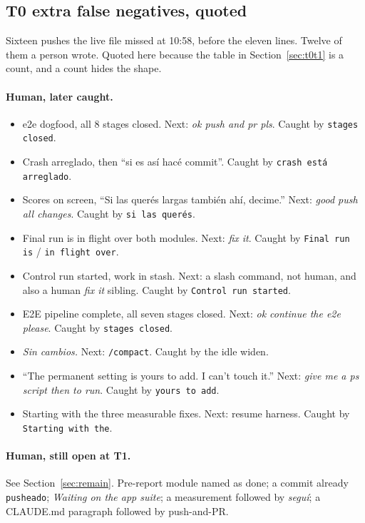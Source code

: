 \subsection{T0 extra false negatives, quoted}
\label{app:t0fn}

Sixteen pushes the live file missed at 10:58, before the eleven lines.
Twelve of them a person wrote. Quoted here because the table in
Section~\ref{sec:t0t1} is a count, and a count hides the shape.

\paragraph{Human, later caught.}
\begin{itemize}
\item e2e dogfood, all 8 stages closed. Next: \emph{ok push and pr pls}.
Caught by \texttt{stages closed}.
\item Crash arreglado, then ``si es as\'i hac\'e commit''. Caught by
\texttt{crash est\'a arreglado}.
\item Scores on screen, ``Si las quer\'es largas tambi\'en ah\'i, decime.''
Next: \emph{good push all changes}. Caught by \texttt{si las quer\'es}.
\item Final run is in flight over both modules. Next: \emph{fix it}.
Caught by \texttt{Final run is} / \texttt{in flight over}.
\item Control run started, work in stash. Next: a slash command, not
human, and also a human \emph{fix it} sibling. Caught by
\texttt{Control run started}.
\item E2E pipeline complete, all seven stages closed. Next: \emph{ok
continue the e2e please}. Caught by \texttt{stages closed}.
\item \emph{Sin cambios.} Next: \texttt{/compact}. Caught by the idle
widen.
\item ``The permanent setting is yours to add. I can't touch it.''
Next: \emph{give me a ps script then to run}. Caught by
\texttt{yours to add}.
\item Starting with the three measurable fixes. Next: resume harness.
Caught by \texttt{Starting with the}.
\end{itemize}

\paragraph{Human, still open at T1.}
See Section~\ref{sec:remain}. Pre-report module named as done; a
commit already \texttt{pusheado}; \emph{Waiting on the app suite};
a measurement followed by \emph{segu\'i}; a CLAUDE.md paragraph
followed by push-and-PR.

